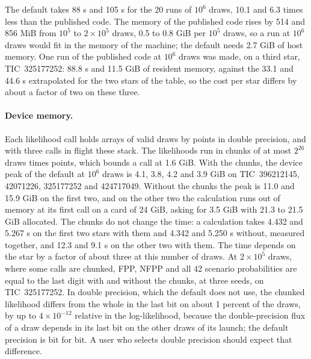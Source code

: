 \documentclass[11pt]{article}
\begin{document}
The default takes 88 s and 105 s for the 20 runs of $10^{6}$ draws, 10.1 and 6.3 times less than the published code. The memory of the published code rises by 514 and 856 MiB from $10^{5}$ to $2\times10^{5}$ draws, 0.5 to 0.8 GiB per $10^{5}$ draws, so a run at $10^{6}$ draws would fit in the memory of the machine; the default needs 2.7 GiB of host memory. One run of the published code at $10^{6}$ draws was made, on a third star, TIC~325177252: 88.8 s and 11.5 GiB of resident memory, against the 33.1 and 44.6 s extrapolated for the two stars of the table, so the cost per star differs by about a factor of two on these three.

\paragraph{Device memory.} Each likelihood call holds arrays of valid draws by points in double precision, and with three calls in flight these stack. The likelihoods run in chunks of at most $2^{26}$ draws times points, which bounds a call at 1.6 GiB. With the chunks, the device peak of the default at $10^{6}$ draws is 4.1, 3.8, 4.2 and 3.9 GiB on TIC~396212145, 42071226, 325177252 and 424717049. Without the chunks the peak is 11.0 and 15.9 GiB on the first two, and on the other two the calculation runs out of memory at its first call on a card of 24 GiB, asking for 3.5 GiB with 21.3 to 21.5 GiB allocated. The chunks do not change the time: a calculation takes 4.432 and 5.267 s on the first two stars with them and 4.342 and 5.250 s without, measured together, and 12.3 and 9.1 s on the other two with them. The time depends on the star by a factor of about three at this number of draws. At $2\times10^{5}$ draws, where some calls are chunked, FPP, NFPP and all 42 scenario probabilities are equal to the last digit with and without the chunks, at three seeds, on TIC~325177252. In double precision, which the default does not use, the chunked likelihood differs from the whole in the last bit on about 1 percent of the draws, by up to $4\times10^{-12}$ relative in the log-likelihood, because the double-precision flux of a draw depends in its last bit on the other draws of its launch; the default precision is bit for bit. A user who selects double precision should expect that difference.
\end{document}
